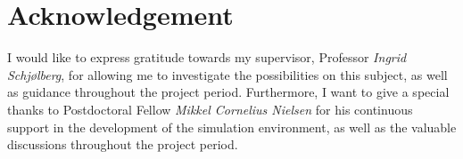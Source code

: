 \section*{Acknowledgement}
I would like to express gratitude towards my supervisor, Professor \textit{Ingrid Schjølberg}, for allowing me to investigate the possibilities on this subject, as well as guidance throughout the project period. Furthermore, I want to give a special thanks to Postdoctoral Fellow \textit{Mikkel Cornelius Nielsen} for his continuous support in the development of the simulation environment, as well as the valuable discussions throughout the project period. 